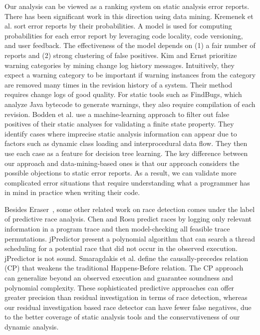 Our analysis can be viewed as a ranking system on static analysis
error reports.  There has been significant work in this direction using data mining.
Kremenek et al. \cite{kremenek2004} sort error reports by their probabilities.  A
model is used for computing probabilities for each error report by
leveraging code locality, code versioning, and user feedback.  The
effectiveness of the model depends on (1) a fair number of reports and
(2) strong clustering of false positives.  Kim and Ernst \cite{kim2007} prioritize
warning categories by mining change log history messages.
Intuitively, they expect a warning category to be important if warning
instances from the category are removed many times in the revision
history of a system. Their method requires change logs of good
quality. For static tools such as FindBugs, which analyze Java
bytecode to generate warnings, they also require compilation of each
revision. Bodden et al. \cite{Bodden2008FPE} use a machine-learning approach to filter out false positives of their static analyses for validating a finite state property.  They identify cases where imprecise static analysis information can appear due to factors such as dynamic class loading and interprocedural data flow.  They then use each case as a feature for decision tree learning.  The key difference between our approach and data-mining-based ones is that our approach considers the possible objections to static error reports.  As a result, we can validate more complicated error situations that require understanding what a programmer has in mind in practice when writing their code. 

Besides Eraser~\cite{266641}, some other related work on race detection comes under the label of predictive race analysis.  
Chen and Rosu \cite{Chen:2007:PSC:1770351.1770387} predict races by logging only relevant information in a program trace and then model-checking all feasible trace permutations.   jPredictor \cite{Chen:2008:JPR:1368088.1368119} present a polynomial algorithm that can search a thread scheduling for a potential race that did not occur in the observed execution. jPredictor is not sound.  Smaragdakis et al. \cite{Smaragdakis:2012:SPR:2103656.2103702} define the causally-precedes relation (CP) that weakens the traditional Happens-Before relation.  The CP approach can generalize beyond an observed execution and guarantee soundness and polynomial complexity. These sophisticated predictive approaches can offer greater precision than residual investigation in terms of race detection, whereas our residual investigation based race detector can have fewer false negatives, due to the better coverage of static analysis tools and the conservativeness of our dynamic analysis.

